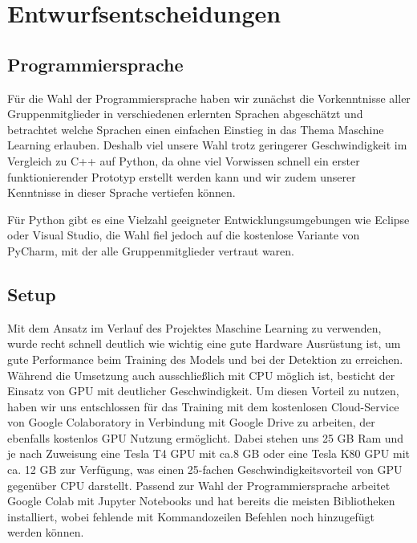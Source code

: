 \chapter{Entwurfsentscheidungen }
\label{ch:entwurf}

\section{Programmiersprache}
Für die Wahl der Programmiersprache haben wir zunächst die Vorkenntnisse aller Gruppenmitglieder in verschiedenen erlernten Sprachen abgeschätzt und betrachtet welche Sprachen einen einfachen Einstieg in das Thema Maschine Learning erlauben. Deshalb viel unsere Wahl trotz geringerer Geschwindigkeit im Vergleich zu C++ auf Python, da ohne viel Vorwissen schnell ein erster funktionierender Prototyp erstellt werden kann und wir zudem unserer Kenntnisse in dieser Sprache vertiefen können.

Für Python gibt es eine Vielzahl geeigneter Entwicklungsumgebungen wie Eclipse oder Visual Studio, die Wahl fiel jedoch auf die kostenlose Variante von PyCharm, mit der alle Gruppenmitglieder vertraut waren.

\section{Setup}
Mit dem Ansatz im Verlauf des Projektes Maschine Learning zu verwenden, wurde recht schnell deutlich wie wichtig eine gute Hardware Ausrüstung ist, um gute Performance beim Training des Models und bei der Detektion zu erreichen. Während die Umsetzung auch ausschließlich mit CPU möglich ist, besticht der Einsatz von GPU mit deutlicher Geschwindigkeit. Um diesen Vorteil zu nutzen, haben wir uns entschlossen für das Training mit dem kostenlosen Cloud-Service von Google Colaboratory in Verbindung mit Google Drive zu arbeiten, der ebenfalls kostenlos GPU Nutzung ermöglicht. Dabei stehen uns 25 GB Ram und je nach Zuweisung eine Tesla T4 GPU mit ca.8 GB oder eine Tesla K80 GPU mit ca. 12 GB zur Verfügung, was einen 25-fachen Geschwindigkeitsvorteil von GPU gegenüber CPU darstellt. Passend zur Wahl der Programmiersprache arbeitet Google Colab mit Jupyter Notebooks und hat bereits die meisten Bibliotheken installiert, wobei fehlende mit Kommandozeilen Befehlen noch hinzugefügt werden können. 

